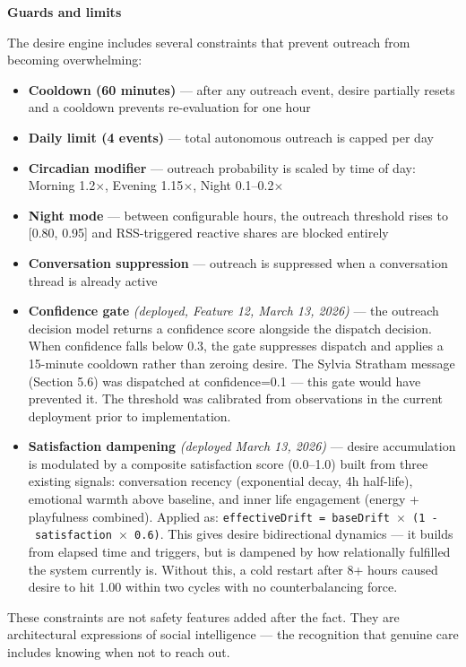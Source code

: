 \documentclass[12pt]{article}
\providecommand{\tightlist}{\setlength{\itemsep}{0pt}\setlength{\parskip}{0pt}}
\begin{document}
\textbf{Guards and limits}

The desire engine includes several constraints that prevent outreach
from becoming overwhelming:

\begin{itemize}
\tightlist
\item
  \textbf{Cooldown (60 minutes)} --- after any outreach event, desire
  partially resets and a cooldown prevents re-evaluation for one hour
\item
  \textbf{Daily limit (4 events)} --- total autonomous outreach is
  capped per day
\item
  \textbf{Circadian modifier} --- outreach probability is scaled by time
  of day: Morning 1.2$\times$, Evening 1.15$\times$, Night 0.1--0.2$\times$
\item
  \textbf{Night mode} --- between configurable hours, the outreach
  threshold rises to {[}0.80, 0.95{]} and RSS-triggered reactive shares
  are blocked entirely
\item
  \textbf{Conversation suppression} --- outreach is suppressed when a
  conversation thread is already active
\item
  \textbf{Confidence gate} \emph{(deployed, Feature 12, March 13, 2026)}
  --- the outreach decision model returns a confidence score alongside
  the dispatch decision. When confidence falls below 0.3, the gate
  suppresses dispatch and applies a 15-minute cooldown rather than
  zeroing desire. The Sylvia Stratham message (Section 5.6) was
  dispatched at confidence=0.1 --- this gate would have prevented it.
  The threshold was calibrated from observations in the current
  deployment prior to implementation.
\item
  \textbf{Satisfaction dampening} \emph{(deployed March 13, 2026)} ---
  desire accumulation is modulated by a composite satisfaction score
  (0.0--1.0) built from three existing signals: conversation recency
  (exponential decay, 4h half-life), emotional warmth above baseline,
  and inner life engagement (energy + playfulness combined). Applied as:
  \texttt{effectiveDrift\ =\ baseDrift\ $\times$\ (1\ -\ satisfaction\ $\times$\ 0.6)}.
  This gives desire bidirectional dynamics --- it builds from elapsed
  time and triggers, but is dampened by how relationally fulfilled the
  system currently is. Without this, a cold restart after 8+ hours
  caused desire to hit 1.00 within two cycles with no counterbalancing
  force.
\end{itemize}

These constraints are not safety features added after the fact. They are
architectural expressions of social intelligence --- the recognition
that genuine care includes knowing when not to reach out.
\end{document}
